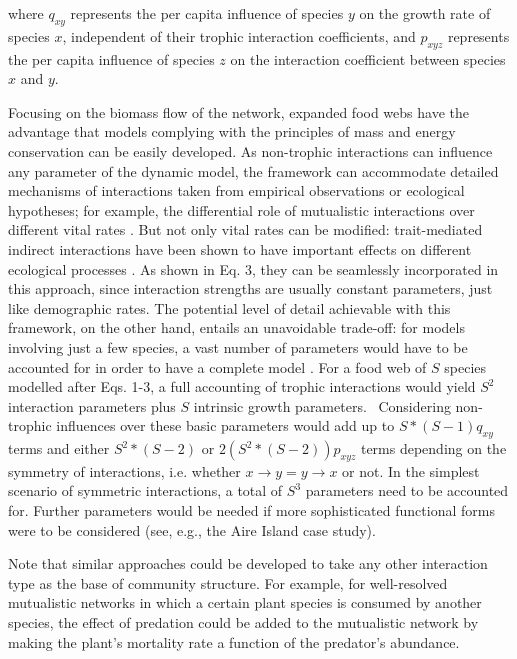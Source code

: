 where  $q_{\mathit{xy}}$ represents the per capita influence of species  $y$ on the growth rate of species  $x$, independent of their trophic interaction coefficients, and  $p_{\mathit{xyz}}$ represents the per capita influence of species  $z$ on the interaction coefficient between species  $x$ and  $y$.

Focusing on the biomass flow of the network, expanded food webs have the advantage that models complying with the principles of mass and energy conservation can be easily developed. As non-trophic interactions can influence any parameter of the dynamic model, the framework can accommodate detailed mechanisms of interactions taken from empirical observations or ecological hypotheses; for example, the differential role of mutualistic interactions over different vital rates \citep{Stachowicz2001}. But not only vital rates can be modified: trait-mediated indirect interactions have been shown to have important effects on different ecological processes \citep{Golubski2016}. As shown in Eq. 3, they can be seamlessly incorporated in this approach, since interaction strengths are usually constant parameters, just like demographic rates. The potential level of detail achievable with this framework, on the other hand, entails an unavoidable trade-off: for models involving just a few species, a vast number of parameters would have to be accounted for in order to have a complete model \citep{Golubski2011}. For a food web of  $S$ species modelled after Eqs. 1-3, a full accounting of trophic interactions would yield  $S^2$ interaction parameters plus  $S$ intrinsic growth parameters. \ Considering non-trophic influences over these basic parameters would add up to  $S{\ast}\left(S-1\right)q_{\mathit{xy}}$ terms and either  $S^2{\ast}\left(S-2\right)$ or  $2\left(S^2{\ast}\left(S-2\right)\right)p_{\mathit{xyz}}$  terms depending on the symmetry of interactions, i.e. whether  $x\rightarrow y=y\rightarrow x$  or not. In the simplest scenario of symmetric interactions, a total of  $S^3$  parameters need to be accounted for. Further parameters would be needed if more sophisticated functional forms were to be considered (see, e.g., the Aire Island case study).

Note that similar approaches could be developed to take any other interaction type as the base of community structure. For example, for well-resolved mutualistic networks in which a certain plant species is consumed by another species, the effect of predation could be added to the mutualistic network by making the plant's mortality rate a function of the predator's abundance.

